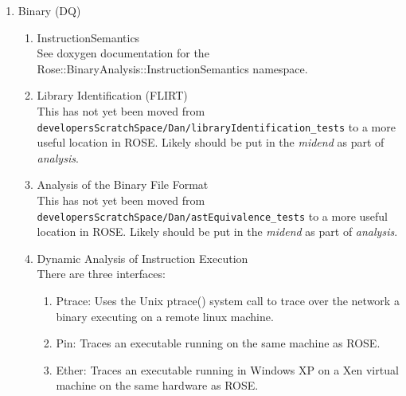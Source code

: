 \begin{enumerate}
\begin{enumerate}
\begin{lstlisting}
     /* Initialize global variables over the given project.
        To be called before interpretation of the "main" function. */
     void initializeGlobals(SgProject *project);

     /* Interprets this stack frame's function with the given arguments.
        Returns the return value of the function. */
     ValueP interpFunction(const std::vector<ValueP> &args);

};

}
\end{lstlisting}
   \end{enumerate}

   \item Binary (DQ) \\
   \begin{enumerate}
      \item InstructionSemantics \\
      See doxygen documentation for the
      Rose::BinaryAnalysis::InstructionSemantics namespace.
      \item Library Identification (FLIRT) \\
      This has not yet been moved from {\tt developersScratchSpace/Dan/libraryIdentification\_tests}
      to a more useful location in ROSE.  Likely should be put in the {\em midend} as part
      of {\em analysis}.

      \item Analysis of the Binary File Format \\
      This has not yet been moved from {\tt developersScratchSpace/Dan/astEquivalence\_tests}
      to a more useful location in ROSE.  Likely should be put in the {\em midend} as part
      of {\em analysis}.

      \item Dynamic Analysis of Instruction Execution \\
      There are three interfaces:
      \begin{enumerate}
         \item Ptrace: Uses the Unix ptrace() system call to trace over 
               the network a binary executing on a remote linux machine.
         \item Pin: Traces an executable running on the same machine as ROSE.
         \item Ether: Traces an executable running in Windows XP on 
               a Xen virtual machine on the same hardware as ROSE.
      \end{enumerate}


\end{enumerate}
\end{enumerate}
